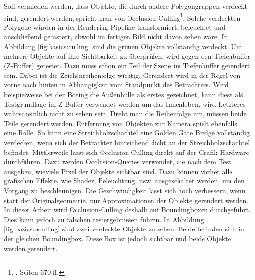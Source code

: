 Soll vermieden werden, dass Objekte, die durch andere Polygongruppen verdeckt sind, gerendert werden, spricht man von Occlusion-Culling\footnote{\cite{RTR3}, Seiten 670 ff.}. Solche verdeckten Polygone würden in der Rendering-Pipeline transformiert, beleuchtet und anschließend gerastert, obwohl im fertigen Bild nicht davon sehen wäre. In Abbildung \ref{fig:basics:culling} sind die grünen Objekte vollständig verdeckt. Um mehrere Objekte auf ihre Sichtbarkeit zu überprüfen, wird gegen den Tiefenbuffer (Z-Buffer) getestet. Dazu muss schon ein Teil der Szene im Tiefenbuffer gerendert sein. Dabei ist die Zeichenreihenfolge wichtig. Gerendert wird in der Regel von vorne nach hinten in Abhängigkeit vom Standpunkt des Betrachters. Wird beispielweise bei der Boeing die Außenhülle als erstes gezeichnet, kann diese als Testgrundlage im Z-Buffer verwendet werden um das Innenleben, wird Letzteres wahrscheinlich nicht zu sehen sein. Dreht man die Reihenfolge um, müssen beide Teile gerendert werden. Entfernung von Objekten zur Kamera spielt ebenfalls eine Rolle. So kann eine Streichholzschachtel eine Golden Gate Bridge vollständig verdecken, wenn sich der Betrachter hinreichend dicht an der Streichholzschachtel befindet. Mittlerweile lässt sich Occlusion-Culling direkt auf der Grafik-Hardware durchführen. Dazu werden Occlusion-Queries verwendet, die nach dem Test ausgeben, wieviele Pixel der Objekte sichtbar sind. Dazu können vorher alle grafischen Effekte, wie Shader, Beleuchtung, usw, ausgeschaltet werden, um den Vorgang zu beschleunigen. Die Geschwindigkeit lässt sich noch verbessern, wenn statt der Originalgeometrie, nur Approximationen der Objekte gerendert werden. In dieser Arbeit wird Occlusion-Culling deshalb auf Boundingboxen durchgeführt. Dies kann jedoch zu falschen testergebnissen führen. In Abbildung \ref{fig:basics:oculling} sind zwei verdeckte Objekte zu sehen. Beide befinden sich in der gleichen Boundingbox. Diese Box ist jedoch sichtbar und beide Objekte werden gerendert.

